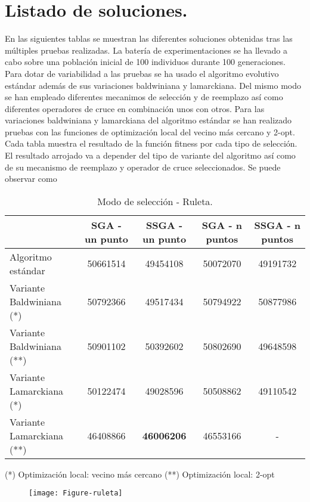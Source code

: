 \documentclass[10pt]{article}
\begin{document}
\section{Listado de soluciones.}  

En las siguientes tablas se muestran las diferentes soluciones obtenidas tras las múltiples pruebas realizadas. La batería de experimentaciones se ha llevado a cabo sobre una población inicial de 100 individuos durante 100 generaciones. Para dotar de variabilidad a las pruebas se ha usado el algoritmo evolutivo estándar además de sus variaciones baldwiniana y lamarckiana. Del mismo modo se han empleado diferentes mecanimos de selección y de reemplazo así como diferentes operadores de cruce en combinación unos con otros. Para las variaciones baldwiniana y lamarckiana del algoritmo estándar se han realizado pruebas con las funciones de optimización local del vecino más cercano y 2-opt.  \\ 

Cada tabla muestra el resultado de la función fitness por cada tipo de selección. El resultado arrojado va a depender del tipo de variante del algoritmo así como de su mecanismo de reemplazo y operador de cruce seleccionados. Se puede observar como \\ 


\begin{table}[htb]
\centering
\begin{tabular}{| l | c | c | c | c |}
\hline
& SGA - un punto & SSGA - un punto & SGA - n puntos & SSGA - n puntos \\
\hline
Algoritmo estándar  & 50661514 & 49454108  & 50072070  & 49191732\\ \cline{1-5}
Variante Baldwiniana (*) & 50792366 & 49517434  & 50794922 & 50877986\\ \cline{1-5}
Variante Baldwiniana (**) & 50901102 & 50392602  & 50802690 & 49648598\\ \cline{1-5}
Variante Lamarckiana (*) & 50122474 & 49028596 & 50508862 & 49110542\\ \cline{1-5}
Variante Lamarckiana (**) & 46408866 & \textbf{46006206}  & 46553166 & - \\
\hline
\end{tabular}
{    (*) Optimización local: vecino más cercano} 
{    (**) Optimización local: 2-opt} 
\caption{Modo de selección - Ruleta.}
\end{table}

\begin{figure}[H]
	\begin{center}
 		\texttt{[image: Figure-ruleta]}
	\end{center} 
\end{figure}
\end{document}
